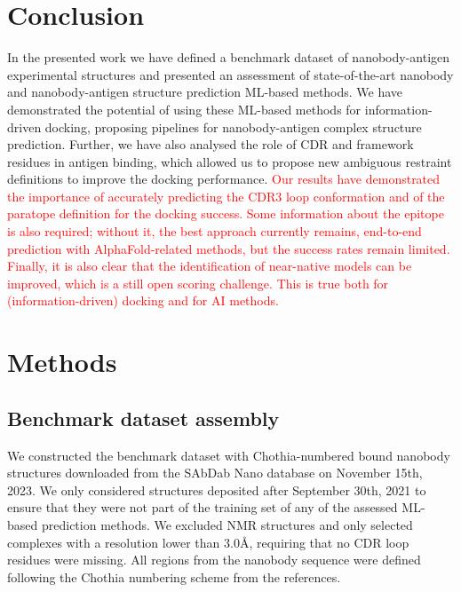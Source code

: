\documentclass[12pt]{article}
\begin{document}
\section{Conclusion} %

In the presented work we have defined a benchmark dataset of nanobody-antigen experimental structures and presented an assessment of state-of-the-art nanobody and nanobody-antigen structure prediction ML-based methods. We have demonstrated the potential of using these ML-based methods for information-driven docking, proposing pipelines for nanobody-antigen complex structure prediction. Further, we have also analysed the role of CDR and framework residues in antigen binding, which allowed us to propose new ambiguous restraint definitions to improve the docking performance. \textcolor{Red}{Our results have demonstrated the importance of accurately predicting the CDR3 loop conformation and of the paratope definition for the docking success. Some information about the epitope is also required; without it, the best approach currently remains, end-to-end prediction with AlphaFold-related methods, but the success rates remain limited. Finally, it is also clear that the identification of near-native models can be improved, which is a still open scoring challenge. This is true both for (information-driven) docking and for AI methods.}
\section{Methods}

\subsection{Benchmark dataset assembly}

We constructed the benchmark dataset with Chothia-numbered \cite{al1997standard} bound nanobody structures downloaded from the SAbDab Nano database \cite{dunbar2014sabdab, schneider2022sabdab} on November 15th, 2023. We only considered structures deposited after September 30th, 2021 to ensure that they were not part of the training set of any of the assessed ML-based prediction methods. We excluded NMR structures and only selected complexes with a resolution lower than $3.0$Å, requiring that no CDR loop residues were missing. All regions from the nanobody sequence were defined following the Chothia numbering scheme from the references.
\end{document}
